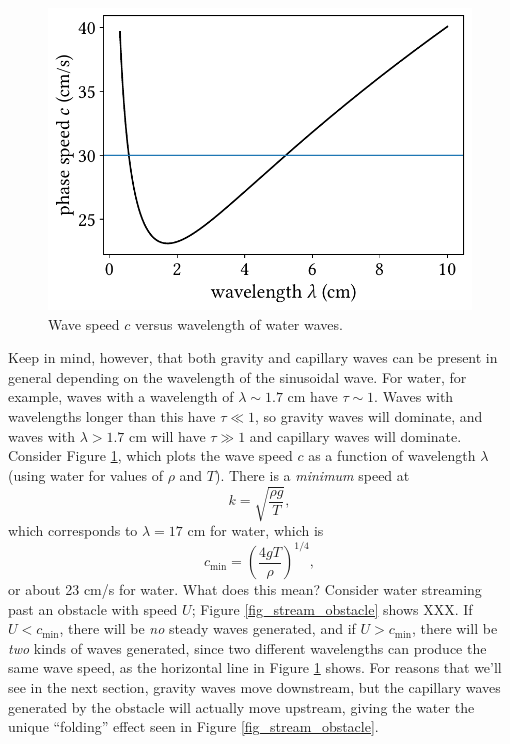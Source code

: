 \begin{figure}
\centering\includegraphics[width=0.7\linewidth]{Figures/Chapter5/fig_grav_and_cap}
\caption{Wave speed $c$ versus wavelength of water waves.}
\label{fig_grav_and_cap}
\end{figure}


Keep in mind, however, that both gravity and capillary waves can be present in general depending on the wavelength of the sinusoidal wave.  For water, for example, waves with a wavelength of $\lambda \sim 1.7$ cm have $\tau \sim 1$.  Waves with wavelengths longer than this have $\tau \ll 1$, so gravity waves will dominate, and waves with $\lambda > 1.7$ cm will have $\tau \gg 1$ and capillary waves will dominate.  Consider Figure \ref{fig_grav_and_cap}, which plots the wave speed $c$ as a function of wavelength $\lambda$ (using water for values of $\rho$ and $T$).  There is a \emph{minimum} speed at
\[
k = \sqrt{\frac{\rho g}{T}},
\]
which corresponds to $\lambda = 17$ cm for water, which is
\begin{equation}
c_\text{min} = \left( \frac{4gT}{\rho} \right)^{1/4},
\end{equation}
or about 23 cm/s for water.  What does this mean?  Consider water streaming past an obstacle with speed $U$; Figure \ref{fig_stream_obstacle} shows XXX.  If $U < c_\text{min}$, there will be \emph{no} steady waves generated, and if $U > c_\text{min}$, there will be \emph{two} kinds of waves generated, since two different wavelengths can produce the same wave speed, as the horizontal line in Figure \ref{fig_grav_and_cap} shows.  For reasons that we'll see in the next section, gravity waves move downstream, but the capillary waves generated by the obstacle will actually move upstream, giving the water the unique ``folding'' effect seen in Figure \ref{fig_stream_obstacle}.




%
%

